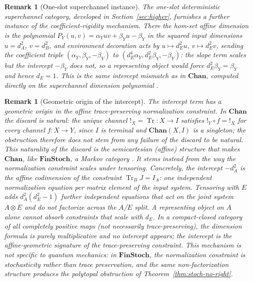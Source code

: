 \documentclass[11pt]{article}
\newtheorem{remark}[theorem]{Remark}
\DeclareMathOperator{\Tr}{Tr}
\begin{document}
\begin{remark}[One-slot superchannel instance]
\label{rem:combs-intercept}
The one-slot deterministic superchannel category, developed in
Section~\ref{sec:higher}, furnishes a further instance of the
coefficient-rigidity mechanism. There the hom-set affine dimension is the
polynomial $P_Y(u,v)=\alpha_Yuv+\beta_Yu-\beta_Y$ in the squared input
dimensions $u=d_A^2$, $v=d_B^2$, and environment decoration acts by
$u\mapsto d_E^2u$, $v\mapsto d_E^2v$, sending the coefficient triple
$(\alpha_Y,\beta_Y,-\beta_Y)$ to $(d_E^4\alpha_Y,d_E^2\beta_Y,-\beta_Y)$: the
slope term scales but the intercept $-\beta_Y$ does not, so a representing object
would force $d_E^2\beta_Y=\beta_Y$ and hence $d_E=1$. This is the same
intercept mismatch as in $\mathbf{Chan}$, computed directly on the superchannel
dimension polynomial \cite{Abaee-combs}.
\end{remark}

\begin{remark}[Geometric origin of the intercept]
\label{rem:geometric-origin}
The intercept term has a geometric origin in the affine trace-preserving
normalization constraint. In $\mathbf{Chan}$ the discard is natural: the
unique channel $!_X=\Tr:X\to I$ satisfies $!_Y\circ f=!_X$ for every channel
$f:X\to Y$, since $I$ is terminal and $\mathbf{Chan}(X,I)$ is a singleton; the
obstruction therefore does not stem from any failure of the discard to be
natural. This naturality of the discard is the semicartesian (affine)
structure that makes $\mathbf{Chan}$, like $\mathbf{FinStoch}$, a Markov
category \cite{Fritz2020, ChoJacobs2019}. It stems instead from the way the normalization constraint scales
under tensoring. Concretely, the intercept $-d_A^2$ is the
affine codimension of the constraint $\Tr_B J=I_A$: one independent
normalization equation per matrix element of the input system. Tensoring
with $E$ adds $d_A^2(d_E^2-1)$ further independent equations that act on
the joint system $A\otimes E$ and do not factorize across the $A$/$E$
split. A representing object on $A$ alone cannot absorb constraints that
scale with $d_E$. In a compact-closed category of all completely positive
maps (not necessarily trace-preserving), the dimension formula is purely
multiplicative and no intercept appears; the intercept is the
affine-geometric signature of the trace-preserving constraint. This
mechanism is not specific to quantum mechanics: in $\mathbf{FinStoch}$, the
normalization constraint is stochasticity rather than trace preservation,
and the same non-factorization structure produces the polytopal obstruction
of Theorem~\ref{thm:stoch-no-right}.
\end{remark}
\end{document}
